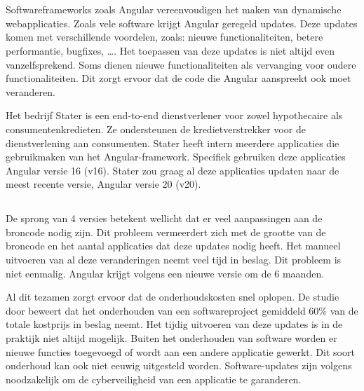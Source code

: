 
\chapter{}%
\label{ch:inleiding}

Softwareframeworks zoals Angular vereenvoudigen het maken van dynamische webapplicaties.
Zoals vele software krijgt Angular geregeld updates.
Deze updates komen met verschillende voordelen, zoals: nieuwe functionaliteiten, betere performantie, bugfixes, \dots.
Het toepassen van deze updates is niet altijd even vanzelfsprekend.
Soms dienen nieuwe functionaliteiten als vervanging voor oudere functionaliteiten.
Dit zorgt ervoor dat de code die Angular aanspreekt ook moet veranderen.

Het bedrijf Stater is een end-to-end dienstverlener voor zowel hypothecaire als consumentenkredieten.
Ze ondersteunen de kredietverstrekker voor de dienstverlening aan consumenten.
Stater heeft intern meerdere applicaties die gebruikmaken van het Angular-framework.
Specifiek gebruiken deze applicaties Angular versie 16 (v16).
Stater zou graag al deze applicaties updaten naar de meest recente versie, Angular versie 20 (v20).

\section{}%
\label{sec:probleemstelling}

De sprong van 4 versies betekent wellicht dat er veel aanpassingen aan de broncode nodig zijn.
Dit probleem vermeerdert zich met de grootte van de broncode en het aantal applicaties dat deze updates nodig heeft.
Het manueel uitvoeren van al deze veranderingen neemt veel tijd in beslag.
Dit probleem is niet eenmalig.
Angular krijgt volgens \textcite{Callaghan2023} een nieuwe versie om de 6 maanden.

Al dit tezamen zorgt ervoor dat de onderhoudskosten snel oplopen.
De studie door \textcite{Kaur2015} beweert dat het onderhouden van een softwareproject gemiddeld 60\% van de totale kostprijs in beslag neemt.
Het tijdig uitvoeren van deze updates is in de praktijk niet altijd mogelijk.
Buiten het onderhouden van software worden er nieuwe functies toegevoegd of wordt aan een andere applicatie gewerkt.
Dit soort onderhoud kan ook niet eeuwig uitgesteld worden.
Software-updates zijn volgens \textcite{Vaniea2016} noodzakelijk om de cyberveiligheid van een applicatie te garanderen.

